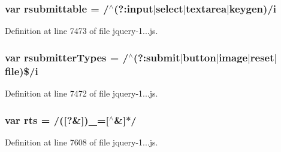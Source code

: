 \subsubsection[{rsubmittable}]{\setlength{\rightskip}{0pt plus 5cm}var rsubmittable = /$^\wedge$(?\+:{\bf input}$\vert$select$\vert$textarea$\vert$keygen)/{\bf i}}\label{obj_2_release_2_package_2_package_tmp_2_scripts_2jquery-1_810_82_8js_a12d248d7e6c5985c5ea21f56fbef9e90}


Definition at line 7473 of file jquery-\/1...\+js.

\hypertarget{obj_2_release_2_package_2_package_tmp_2_scripts_2jquery-1_810_82_8js_a0e9cd4ca08945afe827846f34a36c74a}{}
\subsubsection[{rsubmitter\+Types}]{\setlength{\rightskip}{0pt plus 5cm}var rsubmitter\+Types = /$^\wedge$(?\+:submit$\vert${\bf button}$\vert$image$\vert$reset$\vert$file)\$/{\bf i}}\label{obj_2_release_2_package_2_package_tmp_2_scripts_2jquery-1_810_82_8js_a0e9cd4ca08945afe827846f34a36c74a}


Definition at line 7472 of file jquery-\/1...\+js.

\hypertarget{obj_2_release_2_package_2_package_tmp_2_scripts_2jquery-1_810_82_8js_a38ff30904f54277281a13514d7aea00d}{}
\subsubsection[{rts}]{\setlength{\rightskip}{0pt plus 5cm}var rts = /(\mbox{[}?\&\mbox{]})\+\_\+=\mbox{[}$^\wedge$\&\mbox{]}$\ast$/}\label{obj_2_release_2_package_2_package_tmp_2_scripts_2jquery-1_810_82_8js_a38ff30904f54277281a13514d7aea00d}


Definition at line 7608 of file jquery-\/1...\+js.

